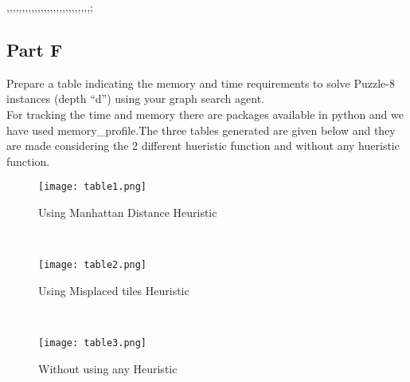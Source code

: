 ,,,,,,,,,,,,,,,,,,,,,,,,,,,;\documentclass[conference]{IEEEtran}
\begin{document}
\subsection{Part F}
\newline
Prepare a table indicating the memory and time requirements to solve Puzzle-8 instances (depth “d”) using your graph search agent.
\\
For tracking the time and memory there are packages available in python and we have used memory\_profile.The three tables generated are given below and they are made considering the 2 different hueristic function and without any hueristic function.

\begin{figure}
\centerline{\texttt{[image: table1.png]}}
{        Using Manhattan Distance Heuristic}

\end{figure}
\\

\begin{figure}
\centerline{\texttt{[image: table2.png]}}
{        Using Misplaced tiles Heuristic}

\end{figure}
\\

\begin{figure}
\centerline{\texttt{[image: table3.png]}}
{        Without using any Heuristic}

\end{figure}
\end{document}
